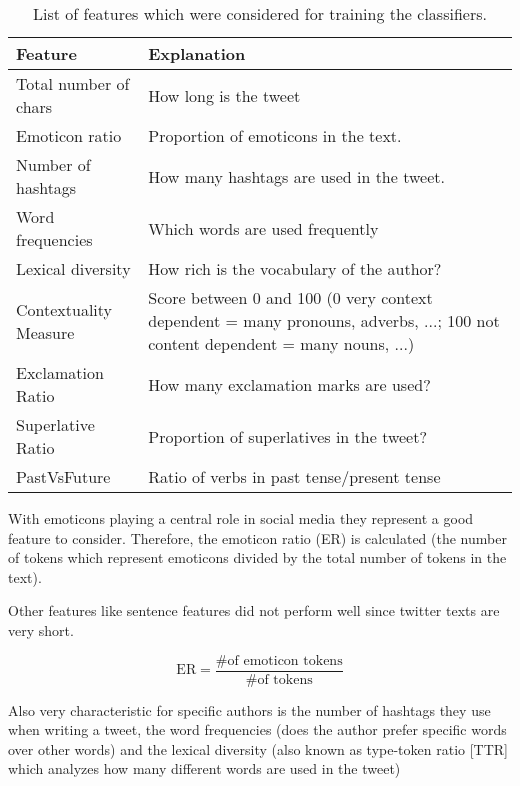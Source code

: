 \documentclass[journal, a4paper]{IEEEtran}
\begin{document}
\begin{table}[!hbt]
	\begin{center}
		\caption{List of features which were considered for training the classifiers.}
		\label{tab:features}
		\begin{tabularx}{80mm}{| l | X |}
			\hline
			\rowcolor{lightgray}
			\textbf{Feature}			& \textbf{Explanation}						\\ \hline\hline
			Total number of chars		& How long is the tweet						\\ \hline
			Emoticon ratio		  	& Proportion of emoticons in the text. 			\\ \hline
			Number of hashtags		& How many hashtags are used in the tweet. 	\\ \hline
			Word frequencies        	& Which words are used frequently 				\\ \hline
			Lexical diversity			& How rich is the vocabulary of the author? 		\\ \hline
			Contextuality Measure		& Score between 0 and 100
								  	(0 very context dependent = many pronouns, adverbs, ...;
									100 not content dependent = many nouns, ...) 
																				\\ \hline
			Exclamation Ratio			& How many exclamation marks are used?		\\ \hline
			Superlative Ratio			& Proportion of superlatives in the tweet?		\\ \hline
			PastVsFuture				& Ratio of verbs in past tense/present tense		\\ \hline
			\hline
		\end{tabularx}
	\end{center}
\end{table}

With emoticons playing a central role in social media they represent a good feature to consider. Therefore, the emoticon ratio (ER) is calculated (the number of tokens which represent emoticons divided by the total number of tokens in the text).

Other features like sentence features did not perform well since twitter texts are very short.

\begin{equation}
	\text{ER} = \frac{\text{\# of emoticon tokens}}{\text{\# of tokens}}
\end{equation}

Also very characteristic for specific authors is the number of hashtags they use when writing a tweet, the word frequencies (does the author prefer specific words over other words) and the lexical diversity (also known as type-token ratio [TTR] which analyzes how many different words are used in the tweet)
\end{document}
